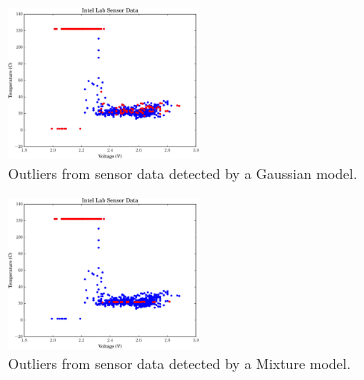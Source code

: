 \begin{figure}[h]
\centering
\includegraphics[width=0.45\textwidth]{../graphics/sensors_gm.pdf}
\caption{Outliers from sensor data detected by a Gaussian model.}
\label{fig:sensors_1k_gm}
\end{figure}
\begin{figure}[h]
\centering
\includegraphics[width=0.45\textwidth]{../graphics/sensors_mm.pdf}
\caption{Outliers from sensor data detected by a Mixture model.}
\label{fig:sensors_1k_mm}
\end{figure}
